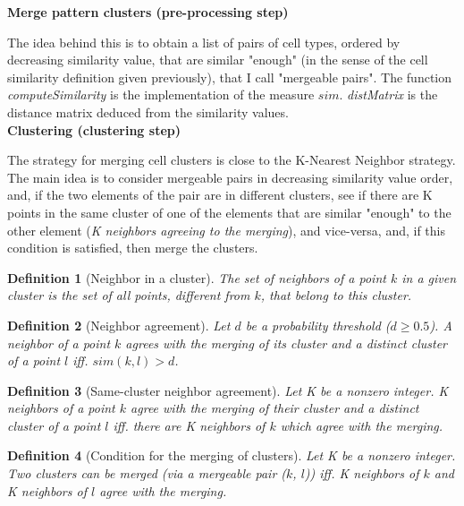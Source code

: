 \documentclass{report}
\newtheorem{definition}{Definition}[section]
\begin{document}
{\bigskip
\noindent \textbf{Merge pattern clusters (pre-processing step)}
\bigskip

The idea behind this is to obtain a list of pairs of cell types, ordered by decreasing similarity value, that are similar "enough" (in the sense of the cell similarity definition given previously), that I call "mergeable pairs". The function \emph{computeSimilarity} is the implementation of the measure $sim$. \emph{distMatrix} is the distance matrix deduced from the similarity values.\\

\bigskip
\noindent \textbf{Clustering (clustering step)}
\bigskip

The strategy for merging cell clusters is close to the K-Nearest Neighbor strategy. The main idea is to consider mergeable pairs in decreasing similarity value order, and, if the two elements of the pair are in different clusters, see if there are K points in the same cluster of one of the elements that are similar "enough" to the other element (\textit{K neighbors agreeing to the merging}), and vice-versa, and, if this condition is satisfied, then merge the clusters.\\

\begin{definition}[Neighbor in a cluster]\label{neighbor}{The set of neighbors of a point $k$ in a given cluster is the set of all points, different from $k$, that belong to this cluster.}\end{definition}

\begin{definition}[Neighbor agreement]\label{neighboragreement}{Let $d$ be a probability threshold ($d \geq 0.5$). A neighbor of a point $k$ agrees with the merging of its cluster and a distinct cluster of a point $l$ iff. $sim(k,l) > d$.}\end{definition}

\begin{definition}[Same-cluster neighbor agreement]\label{neighborsagreement}{Let K be a nonzero integer. K neighbors of a point $k$ agree with the merging of their cluster and a distinct cluster of a point $l$ iff. there are K neighbors of $k$ which agree with the merging.}\end{definition}

\begin{definition}[Condition for the merging of clusters]\label{mergingclusters}{Let K be a nonzero integer. Two clusters can be merged (via a mergeable pair ($k$, $l$)) iff. K neighbors of $k$ and K neighbors of $l$ agree with the merging.}\end{definition}

}
\end{document}
